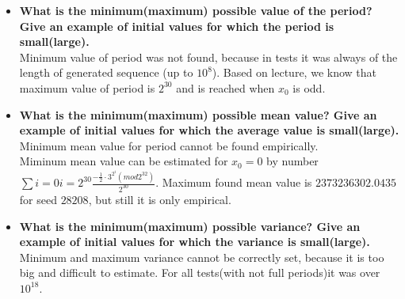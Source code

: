 \documentclass[a4paper,10pt]{article}
\begin{document}
\begin{itemize}
 \item \textbf{What is the minimum(maximum) possible value of the period? Give an example of initial values for which the period is small(large).} \\ 
Minimum value of period was not found, because in tests it was always of the length of generated sequence (up to $10^8$).  Based on lecture, we know that maximum value of period is $2^{30}$ and is reached when $x_0$ is odd.

 \item \textbf{What is the minimum(maximum) possible mean value? Give an example of initial values for which the average value is small(large).} \\
Minimum mean value for period cannot be found empirically. \\
Miminum mean value can be estimated for $x_0 = 0$ by number $\sum{i=0}{i=2^{30}}\frac{-\frac{1}{2} \cdot 3^{2^i}(mod 2^{32})}{2^{30}}$.
Maximum found mean value is $2373236302.0435$ for seed $28208$, but still it is only empirical.

 \item \textbf{What is the minimum(maximum) possible variance? Give an example of initial values for which the variance is small(large).} \\
Minimum and maximum variance cannot be correctly set, because it is too big and difficult to estimate. For all tests(with not full periods)it was over $10^{18}$.


\end{itemize}
\end{document}
